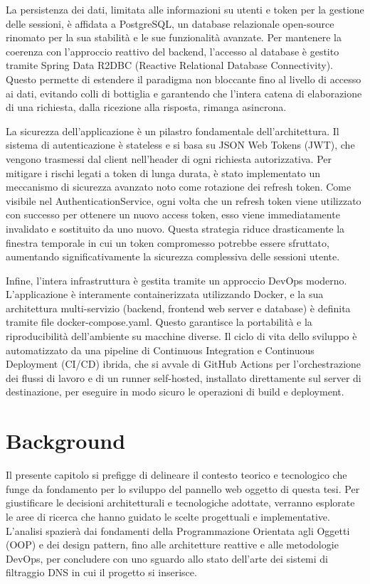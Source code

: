 \documentclass[12pt,a4paper,openright,twoside]{book}
\begin{document}
La persistenza dei dati, limitata alle informazioni su utenti e token per la gestione delle sessioni, è affidata a PostgreSQL, un database relazionale open-source rinomato per la sua stabilità e le sue funzionalità avanzate. Per mantenere la coerenza con l'approccio reattivo del backend, l'accesso al database è gestito tramite Spring Data R2DBC (Reactive Relational Database Connectivity). Questo permette di estendere il paradigma non bloccante fino al livello di accesso ai dati, evitando colli di bottiglia e garantendo che l'intera catena di elaborazione di una richiesta, dalla ricezione alla risposta, rimanga asincrona.

La sicurezza dell'applicazione è un pilastro fondamentale dell'architettura. Il sistema di autenticazione è stateless e si basa su JSON Web Tokens (JWT), che vengono trasmessi dal client nell'header di ogni richiesta autorizzativa. Per mitigare i rischi legati a token di lunga durata, è stato implementato un meccanismo di sicurezza avanzato noto come rotazione dei refresh token. Come visibile nel AuthenticationService, ogni volta che un refresh token viene utilizzato con successo per ottenere un nuovo access token, esso viene immediatamente invalidato e sostituito da uno nuovo. Questa strategia riduce drasticamente la finestra temporale in cui un token compromesso potrebbe essere sfruttato, aumentando significativamente la sicurezza complessiva delle sessioni utente.

Infine, l'intera infrastruttura è gestita tramite un approccio DevOps moderno. L'applicazione è interamente containerizzata utilizzando Docker, e la sua architettura multi-servizio (backend, frontend web server e database) è definita tramite file docker-compose.yaml. Questo garantisce la portabilità e la riproducibilità dell'ambiente su macchine diverse. Il ciclo di vita dello sviluppo è automatizzato da una pipeline di Continuous Integration e Continuous Deployment (CI/CD) ibrida, che si avvale di GitHub Actions per l'orchestrazione dei flussi di lavoro e di un runner self-hosted, installato direttamente sul server di destinazione, per eseguire in modo sicuro le operazioni di build e deployment.

\chapter{Background}
\label{chap:background}

Il presente capitolo si prefigge di delineare il contesto teorico e tecnologico che funge da fondamento per lo sviluppo del pannello web oggetto di questa tesi.  Per giustificare le decisioni architetturali e tecnologiche adottate, verranno esplorate le aree di ricerca che hanno guidato le scelte progettuali e implementative.  L'analisi spazierà dai fondamenti della Programmazione Orientata agli Oggetti (OOP) e dei design pattern, fino alle architetture reattive e alle metodologie DevOps, per concludere con uno sguardo allo stato dell'arte dei sistemi di filtraggio DNS in cui il progetto si inserisce. 
\end{document}
